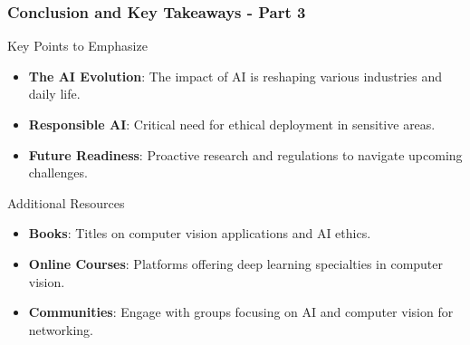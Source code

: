 \documentclass[aspectratio=169]{beamer}
\begin{document}
\begin{frame}[fragile]
    \frametitle{Conclusion and Key Takeaways - Part 3}
    \begin{block}{Key Points to Emphasize}
        \begin{itemize}
            \item \textbf{The AI Evolution}: The impact of AI is reshaping various industries and daily life.
            \item \textbf{Responsible AI}: Critical need for ethical deployment in sensitive areas.
            \item \textbf{Future Readiness}: Proactive research and regulations to navigate upcoming challenges.
        \end{itemize}
    \end{block}
    
    \begin{block}{Additional Resources}
        \begin{itemize}
            \item \textbf{Books}: Titles on computer vision applications and AI ethics.
            \item \textbf{Online Courses}: Platforms offering deep learning specialties in computer vision.
            \item \textbf{Communities}: Engage with groups focusing on AI and computer vision for networking.
        \end{itemize}
    \end{block}
\end{frame}
\end{document}
